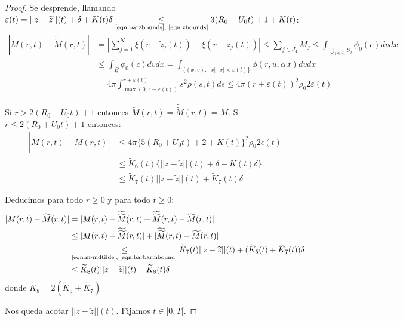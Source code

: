 \documentclass[a4paper,10pt]{scrartcl}
\theoremstyle{definition}
\newcommand{\ktilde}{\widetilde{K}}
\newcommand{\dtilde}[1]{\widetilde{\widetilde{#1}}}
\numberwithin{equation}{section}
\begin{document}
\begin{proof}
 Se desprende, llamando $\varepsilon(t) = ||z-\widetilde{z}||(t) + \delta + K(t)\delta \underset{\textrm{\eqref{eqn:barzbounds}, \eqref{eqn:zbounds}}}{\le} 3(R_0 + U_0 t) + 1 + K(t)$:
 \begin{align*}
 |\widetilde{M}(r,t) - \dtilde{M}(r,t)| &= \left|\sum_{j=1}^N \xi(r - \widetilde{z}_j(t)) - \xi(r - z_j(t)) \right| \le \sum_{j\in J_4} M_j
 \le \int_{\bigcup_{j\in J_4} S_j} \phi_0(c) dv dx\\
 &\le \int_{\underline{B}} \phi_0(c) dv dx
 = \int_{\{(x,v):||x| - r| < \varepsilon(t)\}} \phi(r,u,\alpha.t) dv dx \\
 &= 4\pi \int_{\max(0,r-\varepsilon(t))}^{r+\varepsilon(t)}  s^2 \rho(s,t) ds \le 4\pi(r + \varepsilon(t))^2 \rho_0 2\varepsilon(t)
 \end{align*}
 
 Si $r > 2(R_0 + U_0t) + 1$ entonces $\widetilde{M}(r,t) = \dtilde{M}(r,t) = M$. Si $r \le 2(R_0 + U_0t) + 1$ entonces:
 \begin{align}
  |\widetilde{M}(r,t) - \dtilde{M}(r,t)| &\le 4\pi\bigg\{5(R_0 + U_0t) + 2 + K(t)\bigg\}^2 \rho_0 2\epsilon(t) \nonumber\\
  &\le \ktilde_6(t)\bigg\{||z-\widetilde{z}||(t) + \delta + K(t)\delta\bigg\} 
  \nonumber \\
  &\le \ktilde_7(t)||z - \widetilde{z}||(t) + \ktilde_7(t)\delta \label{eqn:barbarmbound}
 \end{align}
 
 Deducimos para todo $r\ge 0$ y para todo $t \ge 0$:
 \begin{align}
  |M(r,t) - \widetilde{M}(r,t)| &= |M(r,t) - \dtilde{M}(r,t) + \dtilde{M}(r,t) - \widetilde{M}(r,t)| \nonumber\\
  &\le |M(r,t) - \dtilde{M}(r,t)| + |\dtilde{M}(r,t) - \widetilde{M}(r,t)| \nonumber\\
  &\underset{\textrm{\eqref{eqn:m-mdtilde}, \eqref{eqn:barbarmbound}}}{\le} \ktilde_7(t)||z - \widetilde{z}||(t) + (\ktilde_5(t)+\ktilde_7(t))\delta \nonumber\\
  &\le \ktilde_8(t)||z - \widetilde{z}||(t) + \ktilde_8(t)\delta
  \label{ineq:diffm}
 \end{align}
donde $\ktilde_8 = 2(\ktilde_5 + \ktilde_7)$

Nos queda acotar $||z - \widetilde{z}||(t)$. Fijamos $t \in [0,T[$.


\end{proof}
\end{document}
